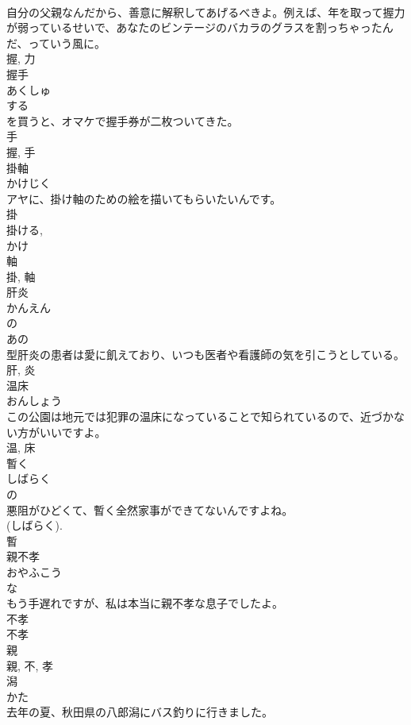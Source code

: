 \documentclass[8pt]{extreport}
\begin{document}
\begin{CJK}{UTF8}{min}
\\	自分の父親なんだから、善意に解釈してあげるべきよ。例えば、年を取って握力が弱っているせいで、あなたのビンテージのバカラのグラスを割っちゃったんだ、っていう風に。	
\\	握, 力	
\\	握手	
\\	あくしゅ	
\\	する 
\\	を買うと、オマケで握手券が二枚ついてきた。	
\\	手 
\\	握, 手	
\\	掛軸	
\\	かけじく	
\\	アヤに、掛け軸のための絵を描いてもらいたいんです。	
\\	掛 
\\	掛ける, 
\\	かけ 
\\	軸 
\\	掛, 軸	
\\	肝炎	
\\	かんえん	
\\	の 
\\	あの
\\	型肝炎の患者は愛に飢えており、いつも医者や看護師の気を引こうとしている。	
\\	肝, 炎	
\\	温床	
\\	おんしょう	
\\	この公園は地元では犯罪の温床になっていることで知られているので、近づかない方がいいですよ。	
\\	温, 床	
\\	暫く	
\\	しばらく	
\\	の 
\\	悪阻がひどくて、暫く全然家事ができてないんですよね。	
\\	(しばらく). 
\\	暫	
\\	親不孝	
\\	おやふこう	
\\	な 
\\	もう手遅れですが、私は本当に親不孝な息子でしたよ。	
\\	不孝 
\\	不孝 
\\	親
\\	親, 不, 孝	
\\	潟	
\\	かた	
\\	去年の夏、秋田県の八郎潟にバス釣りに行きました。	

\end{CJK}
\end{document}
